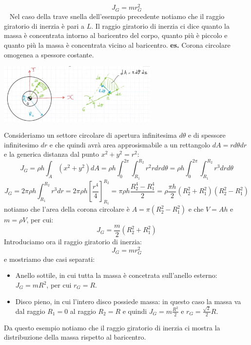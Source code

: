 \[
    J_G = m r_G^2
\]
\ \newline
Nel caso della trave snella dell'esempio precedente notiamo che il raggio giratorio di inerzia è pari a $L$.\newline
\newline
Il raggio giratorio di inerzia ci dice quanto la massa è concentrata intorno al baricentro del corpo, quanto più è piccolo e quanto più la massa è concentrata vicino al baricentro.
\newline
\newline
\textbf{es.} Corona circolare omogenea a spessore costante.
\begin{center}
    \includegraphics[height=3cm]{../lezione8/img7.JPG}
\end{center}
Consideriamo un settore circolare di apertura infinitesima $d \theta$ e di spessore infinitesimo $d r$ e che quindi avrà area approsismabile a un rettangolo $dA = r d \theta d r$ e la generica distanza dal punto $x^2 + y^2 = r^2$:
\[
    J_G = \rho h \int_A (x^2 + y^2) dA = \rho h \int_{0}^{2\pi} \int_{R_1}^{R_2} r^2 r d r d \theta = \rho h \int_{0}^{2\pi} \int_{R_1}^{R_2} r^3 d r d \theta
\]
\[
    J_G = 2 \pi \rho h \int_{R_1}^{R_2} r^3 dr = 2 \pi \rho h \left[\frac{r^4}{4}\right]_{R_1}^{R_2} = \pi \rho h \frac{R_2^4 - R_1^4}{2} = \rho \frac{\pi h }{2} (R_2^2 + R_1^2) (R_2^2 - R_1^2)
\]
notiamo che l'area della corona circolare è $A = \pi (R_2^2 -R_1^2)$ e che $V = A h$ e $m = \rho V$, per cui:
\[
    J_G = \frac{m}{2}(R_2^2 + R_1^2)
\]
Introduciamo ora il raggio giratorio di inerzia:
\[
    J_G = m r_G^2
\]
e mostriamo due casi separati:
\begin{itemize}
    \item Anello sottile, in cui tutta la massa è concetrata sull'anello esterno: $J_G = m R^2$, per cui $r_G = R$.
    \item Disco pieno, in cui l'intero disco possiede massa: in questo caso la massa va dal raggio $R_1= 0$ al raggio $R_2 = R$ e quindi $J_G = m \frac{R^2}{2}$ e $r_G = \frac{\sqrt{2}}{2}R$.
\end{itemize}
Da questo esempio notiamo che il raggio giratorio di inerzia ci mostra la distribuzione della massa rispetto al baricentro.\newline
\newline
